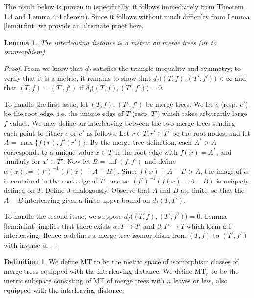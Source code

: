 \documentclass{article}
\newtheorem{lemma}[theorem]{Lemma}
\theoremstyle{definition}
\newtheorem{definition}[theorem]{Definition}
\newcommand{\MT}{\mathrm{MT}}
\begin{document}
The result below is proven in \cite{cardona2022universal} (specifically, it follows immediately from Theorem 1.4 and Lemma 4.4 therein). Since it follows without much difficulty from Lemma \ref{lem:infint} we provide an alternate proof here.

\begin{lemma}
    \label{lem:intmetric}
    The interleaving distance is a metric on merge trees (up to isomorphism).
\end{lemma}

\begin{proof}
    From \cite[Lemma 1]{morozov2013interleaving} we know that $d_I$ satisfies the triangle inequality and symmetry; to verify that it is a metric, it remains to show that $d_I\big((T,f),(T',f')\big)<\infty$ and that $(T,f)=(T',f')$ if $d_I\big((T,f),(T',f')\big)= 0$.

    To handle the first issue, let $(T,f)$, $(T',f')$ be merge trees. We let $e$ (resp. $e'$) be the root edge, i.e. the unique edge of $T$ (resp. $T'$) which takes arbitrarily large $f$-values. We may define an interleaving between the two merge trees sending each point to either $e$ or $e'$ as follows. Let $r\in T, r'\in T'$ be the root nodes, and let $A = \max\{f(r),f'(r')\}$. By the merge tree definition, each $A^*>A$ corresponds to a unique value $x\in T$ in the root edge with $f(x) = A^*$, and similarly for $x'\in T'$. Now let $B=\inf(f,f')$ and define $\alpha(x):= (f')^{-1}(f(x) + A - B).$ Since $f(x)+A-B > A$, the image of $\alpha$ is contained in the root edge of $T'$, and so $(f')^{-1}(f(x) + A - B)$ is uniquely defined on $T$. Define $\beta$ analogously. Observe that $A$ and $B$ are finite, so that the $A-B$ interleaving gives a finite upper bound on $d_I(T,T')$.

    To handle the second issue, we suppose $d_I\big((T,f),(T',f')\big) = 0$. Lemma \ref{lem:infint} implies that there exists $\alpha:T\to T'$ and $\beta:T' \to T$ which form a $0$-interleaving. Hence $\alpha$ defines a merge tree isomorphism from $(T,f)$ to $(T',f')$ with inverse $\beta$.
\end{proof}

\begin{definition}
    We define $\MT$ to be the metric space of isomorphism classes of merge trees equipped with the interleaving distance. We define $\MT_n$ to be the metric subspace consisting of $\MT$ of merge trees with $n$ leaves or less, also equipped with the interleaving distance.
\end{definition}
\end{document}
